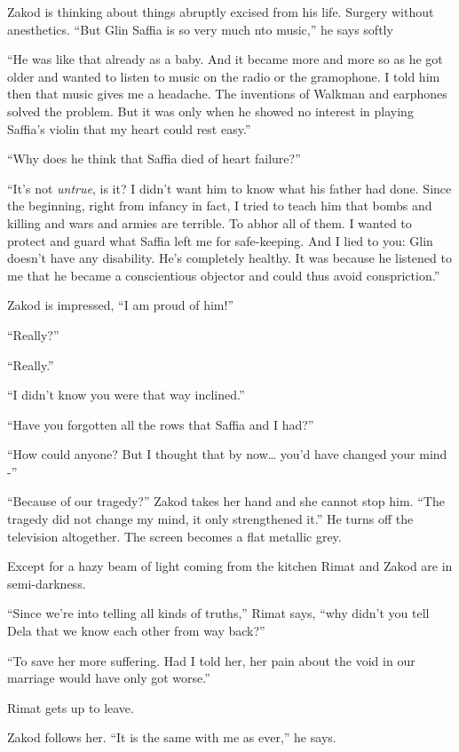 \documentclass[twoside,11pt]{book}
\begin{document}
Zakod is thinking about things abruptly excised from his life. Surgery without anesthetics. ``But Glin
Saffia is so very much nto music,'' he says softly

``He was like that already as a baby. And it became more and more so as he got older and wanted to listen
to music on the radio or the gramophone. I told him then that music gives me a headache. The inventions of Walkman and
earphones solved the problem. But it was only when he showed no interest in playing Saffia's violin that my heart could
rest easy.''

``Why does he think that Saffia died of heart failure?''

``It's not \textit{untrue}, is it? I didn't want him to know what his father had done. Since the beginning,
right from infancy in fact, I tried to teach him that bombs and killing and wars and armies are terrible.  To abhor all
of them. I wanted to protect and guard what Saffia left me for safe-keeping. And I lied to you: Glin doesn't have any
disability. He's completely healthy.  It was because he listened to me that he became a conscientious objector and
could thus avoid conspriction.''

Zakod is impressed, ``I am proud of him!''

``Really?''

``Really.''

``I didn't know you were that way inclined.''

``Have you forgotten all the rows that Saffia and I had?''

``How could anyone? But I thought that by now{\dots} you'd have changed your mind -''

``Because of our tragedy?'' Zakod takes her hand and she cannot stop him. ``The
tragedy did not change my mind, it only strengthened it.'' He turns off the television altogether. The
screen becomes a flat metallic grey.

Except for a hazy beam of light coming
from the kitchen Rimat and
Zakod are in semi-darkness.

``Since we're into telling all kinds of truths,'' Rimat says, ``why didn't you
tell Dela that we know each other from way back?''

``To save her more suffering. Had I told her, her pain about the void in our marriage would have only
got worse.''

Rimat gets up to leave.

Zakod follows her. ``It is the same with me as ever,'' he says.
\end{document}
